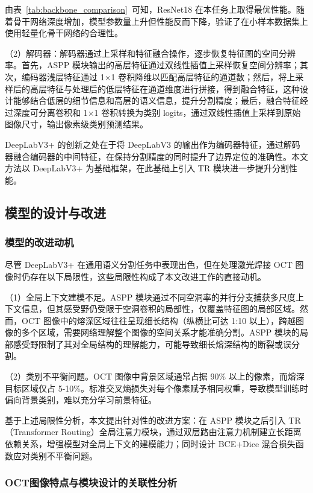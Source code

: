 由表~\ref{tab:backbone_comparison}~可知，ResNet18 在本任务上取得最优性能。随着骨干网络深度增加，模型参数量上升但性能反而下降，验证了在小样本数据集上使用轻量化骨干网络的合理性。

（2）解码器：解码器通过上采样和特征融合操作，逐步恢复特征图的空间分辨率。首先，ASPP 模块输出的高层特征通过双线性插值上采样恢复空间分辨率；其次，编码器浅层特征通过 1×1 卷积降维以匹配高层特征的通道数；然后，将上采样后的高层特征与处理后的低层特征在通道维度进行拼接，得到融合特征，这种设计能够结合低层的细节信息和高层的语义信息，提升分割精度；最后，融合特征经过深度可分离卷积和 1×1 卷积转换为类别 logits，通过双线性插值上采样到原始图像尺寸，输出像素级类别预测结果。

DeepLabV3+ 的创新之处在于将 DeepLabV3 的输出作为编码器特征，通过解码器融合编码器的中间特征，在保持分割精度的同时提升了边界定位的准确性。本文方法以 DeepLabV3+ 为基础框架，在此基础上引入 TR 模块进一步提升分割性能。

\subsection{模型的设计与改进}

\subsubsection{模型的改进动机}

尽管 DeepLabV3+ 在通用语义分割任务中表现出色，但在处理激光焊接 OCT 图像时仍存在以下局限性，这些局限性构成了本文改进工作的直接动机。

（1）全局上下文建模不足。ASPP 模块通过不同空洞率的并行分支捕获多尺度上下文信息，但其感受野仍受限于空洞卷积的局部性，仅覆盖特征图的局部区域。然而，OCT 图像中的熔深区域往往呈现细长结构（纵横比可达 1:10 以上），跨越图像的多个区域，需要网络理解整个图像的空间关系才能准确分割。ASPP 模块的局部感受野限制了其对全局结构的理解能力，可能导致细长熔深结构的断裂或误分割。

（2）类别不平衡问题。OCT 图像中背景区域通常占据 90\% 以上的像素，而熔深目标区域仅占 5-10\%。标准交叉熵损失对每个像素赋予相同权重，导致模型训练时偏向背景类别，难以充分学习前景特征。

基于上述局限性分析，本文提出针对性的改进方案：在 ASPP 模块之后引入 TR（Transformer Routing）全局注意力模块，通过双层路由注意力机制建立长距离依赖关系，增强模型对全局上下文的建模能力；同时设计 BCE+Dice 混合损失函数应对类别不平衡问题。

\subsubsection{OCT图像特点与模块设计的关联性分析}

